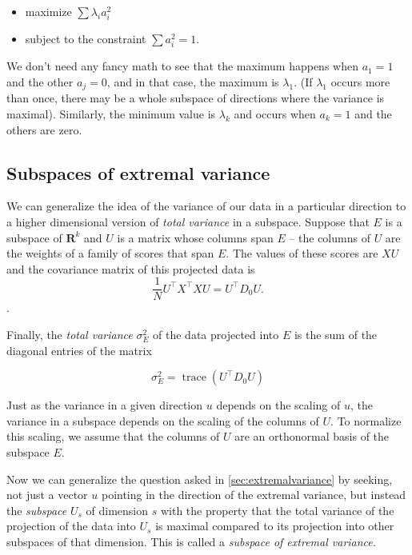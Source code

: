 \documentclass[
  oneside]{scrbook}
\providecommand{\tightlist}{%
  \setlength{\itemsep}{0pt}\setlength{\parskip}{0pt}}
\begin{document}
\begin{itemize}
\tightlist
\item
  maximize \(\sum \lambda_{i}a_{i}^2\)
\item
  subject to the constraint \(\sum a_{i}^2 = 1\).
\end{itemize}

We don't need any fancy math to see that the maximum happens when
\(a_{1}=1\) and the other \(a_{j}=0\), and in that case, the maximum is
\(\lambda_{1}\). (If \(\lambda_{1}\) occurs more than once, there may be
a whole subspace of directions where the variance is maximal).
Similarly, the minimum value is \(\lambda_{k}\) and occurs when
\(a_{k}=1\) and the others are zero.

\hypertarget{sec:subspaces}{%
\subsection{Subspaces of extremal variance}\label{sec:subspaces}}

We can generalize the idea of the variance of our data in a particular
direction to a higher dimensional version of \emph{total variance} in a
subspace. Suppose that \(E\) is a subspace of \(\mathbf{R}^{k}\) and
\(U\) is a matrix whose columns span \(E\) -- the columns of \(U\) are
the weights of a family of scores that span \(E\). The values of these
scores are \(XU\) and the covariance matrix of this projected data is
\[\frac{1}{N}U^{\intercal}X^{\intercal}XU=U^{\intercal}D_{0}U.\].

Finally, the \emph{total variance} \(\sigma_{E}^2\) of the data
projected into \(E\) is the sum of the diagonal entries of the matrix

\[
\sigma^2_{E} = \mathop{trace}(U^{\intercal}D_{0}U)
\]

Just as the variance in a given direction \(u\) depends on the scaling
of \(u\), the variance in a subspace depends on the scaling of the
columns of \(U\). To normalize this scaling, we assume that the columns
of \(U\) are an orthonormal basis of the subspace \(E\).

Now we can generalize the question asked in \cref{sec:extremalvariance}
by seeking, not just a vector \(u\) pointing in the direction of the
extremal variance, but instead the \emph{subspace} \(U_{s}\) of
dimension \(s\) with the property that the total variance of the
projection of the data into \(U_{s}\) is maximal compared to its
projection into other subspaces of that dimension. This is called a
\emph{subspace of extremal variance.}
\end{document}
